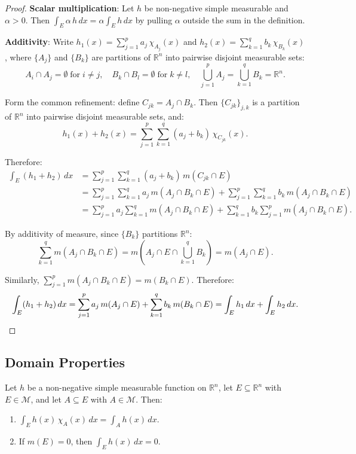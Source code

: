 \documentclass[11pt]{report}
\begin{document}
\begin{proof}
\textbf{Scalar multiplication}: Let $h$ be non-negative simple measurable and $\alpha > 0$. Then $\int_E \alpha\, h\,dx = \alpha \int_E h\,dx$ by pulling $\alpha$ outside the sum in the definition.

\textbf{Additivity}: Write $h_1(x) = \sum_{j=1}^{p} a_j \, \chi_{A_j}(x)$ and $h_2(x) = \sum_{k=1}^{q} b_k \, \chi_{B_k}(x)$, where $\{A_j\}$ and $\{B_k\}$ are partitions of $\mathbb{R}^n$ into pairwise disjoint measurable sets:
\[
A_i \cap A_j = \emptyset \;\text{for}\; i \neq j, \quad B_k \cap B_l = \emptyset \;\text{for}\; k \neq l, \quad \bigcup_{j=1}^{p} A_j = \bigcup_{k=1}^{q} B_k = \mathbb{R}^n.
\]

Form the common refinement: define $C_{jk} = A_j \cap B_k$. Then $\{C_{jk}\}_{j,k}$ is a partition of $\mathbb{R}^n$ into pairwise disjoint measurable sets, and:
\[
h_1(x) + h_2(x) = \sum_{j=1}^{p} \sum_{k=1}^{q} (a_j + b_k)\,\chi_{C_{jk}}(x).
\]

Therefore:
\begin{align*}
\int_E (h_1 + h_2)\,dx &= \sum_{j=1}^{p} \sum_{k=1}^{q} (a_j + b_k)\,m(C_{jk} \cap E) \\
&= \sum_{j=1}^{p} \sum_{k=1}^{q} a_j\,m(A_j \cap B_k \cap E) + \sum_{j=1}^{p} \sum_{k=1}^{q} b_k\,m(A_j \cap B_k \cap E) \\
&= \sum_{j=1}^{p} a_j \sum_{k=1}^{q} m(A_j \cap B_k \cap E) + \sum_{k=1}^{q} b_k \sum_{j=1}^{p} m(A_j \cap B_k \cap E).
\end{align*}

By additivity of measure, since $\{B_k\}$ partitions $\mathbb{R}^n$:
\[
\sum_{k=1}^{q} m(A_j \cap B_k \cap E) = m\!\left(A_j \cap E \cap \bigcup_{k=1}^{q} B_k\right) = m(A_j \cap E).
\]

Similarly, $\sum_{j=1}^{p} m(A_j \cap B_k \cap E) = m(B_k \cap E)$. Therefore:
\[
\int_E (h_1 + h_2)\,dx = \sum_{j=1}^{p} a_j\,m(A_j \cap E) + \sum_{k=1}^{q} b_k\,m(B_k \cap E) = \int_E h_1\,dx + \int_E h_2\,dx. \qedhere
\]
\end{proof}

\subsection{Domain Properties}

\begin{propbox}
Let $h$ be a non-negative simple measurable function on $\mathbb{R}^n$, let $E \subseteq \mathbb{R}^n$ with $E \in \mathcal{M}$, and let $A \subseteq E$ with $A \in \mathcal{M}$. Then:
\begin{enumerate}[label=(\roman*)]
\item $\displaystyle\int_E h(x)\,\chi_A(x)\,dx = \int_A h(x)\,dx$.
\item If $m(E) = 0$, then $\displaystyle\int_E h(x)\,dx = 0$.
\end{enumerate}
\end{propbox}
\end{document}
